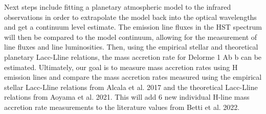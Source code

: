     {
    Next steps include fitting a planetary atmospheric model to the infrared observations in order to extrapolate the model back into the optical wavelengths and get a continuum level estimate. The emission line fluxes in the HST spectrum will then be compared to the model continuum, allowing for the measurement of line fluxes and line luminosities. Then, using the empirical stellar and theoretical planetary Lacc-Lline relations, the mass accretion rate for Delorme 1 Ab b can be estimated. Ultimately, our goal is to measure mass accretion rates using H emission lines and compare the mass accretion rates measured using the empirical stellar Lacc-Lline relations from Alcala et al. 2017 and the theoretical Lacc-Lline relations from Aoyama et al. 2021. This will add 6 new individual H-line mass accretion rate measurements to the literature values from Betti et al. 2022.
    }

    \newpage
    